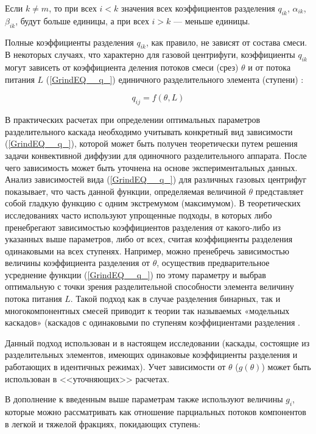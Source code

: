 Если $k\ne m$, то при всех $i<k$ значения всех коэффициентов разделения $q_{ik}$, $\alpha _{ik}$, $\beta _{ik}$, будут больше единицы, а при всех $i>k$ --- меньше единицы.

Полные коэффициенты разделения $q_{ik} $, как правило, не зависят от состава смеси. В некоторых случаях, что характерно для газовой центрифуги, коэффициенты $q_{ik}$ могут зависеть от коэффициента деления потоков смеси (срез) $\theta$ и от потока питания $L$ (\ref{GrindEQ__q_}) единичного разделительного элемента (ступени) \cite{mustafinObjectiveFunctionOptimization2019}:

\begin{equation} \label{GrindEQ__q_} 
  q_{ij} = f(\theta, L)          
\end{equation}

В практических расчетах при определении оптимальных параметров разделительного каскада необходимо учитывать конкретный вид зависимости (\ref{GrindEQ__q_}), которой может быть получен теоретически путем решения задачи конвективной диффузии для одиночного разделительного аппарата. После чего зависимость может быть уточнена на основе экспериментальных данных. 
Анализ зависимостей вида (\ref{GrindEQ__q_}) для различных газовых центрифуг показывает, что часть данной функции, определяемая величиной $\theta $ представляет собой гладкую функцию с одним экстремумом (максимумом). В теоретических исследованиях часто используют упрощенные подходы, в которых либо пренебрегают зависимостью коэффициентов разделения от какого-либо из указанных выше параметров, либо от всех, считая коэффициенты разделения одинаковыми на всех ступенях. Например, можно пренебречь зависимостью величины коэффициента разделения от $\theta$, осуществив предварительное усреднение функции (\ref{GrindEQ__q_}) по этому параметру и выбрав оптимальную с точки зрения разделительной способности элемента величину потока питания $L$. Такой подход как в случае разделения бинарных, так и многокомпонентных смесей приводит к теории так называемых «модельных каскадов» (каскадов с одинаковыми по ступеням коэффициентами разделения \cite{sulaberidzeClassificationModelCascades2020}.

Данный подход использован и в настоящем исследовании (каскады, состоящие из разделительных элементов, имеющих одинаковые коэффициенты разделения и работающих в идентичных режимах). Учет зависимости от $\theta$ ($g(\theta)$) может быть использован в <<уточняющих>> расчетах.

В дополнение к введенным выше параметрам также используют величины $g_{i}$, которые можно рассматривать как отношение парциальных потоков компонентов в легкой и тяжелой фракциях, покидающих ступень:

